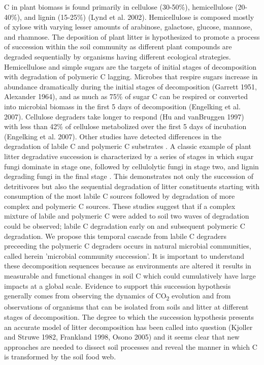 C in plant biomass is found primarily in cellulose (30-50\%), hemicellulose (20-40\%), and lignin (15-25\%) (Lynd et al. 2002). Hemicellulose is composed mostly of xylose with varying lesser amounts of arabinose, galactose, glucose, mannose, and rhamnose. The deposition of plant litter is hypothesized to promote a process of succession within the soil community as different plant compounds are degraded sequentially by organisms having different ecological strategies. Hemicellulose and simple sugars are the targets of initial stages of decomposition with degradation of polymeric C lagging. Microbes that respire sugars increase in abundance dramatically during the initial stages of decomposition (Garrett 1951, Alexander 1964), and as much as 75\% of sugar C can be respired or converted into microbial biomass in the first 5 days of decomposition (Engelking et al. 2007). Cellulose degraders take longer to respond (Hu and vanBruggen 1997) with less than 42\% of cellulose metabolized over the first 5 days of incubation (Engelking et al. 2007). Other studies have detected differences in the degradation of labile C and polymeric C substrates \cite{Engelking_2007,Anderson_1973,Stotzky_1961,Alden_2001,Furukawa_1996,Fontaine_2003,Blagodatskaya_2007,Jenkins_2010,Rui_2009,Fierer_2010}. A classic example of plant litter degradative succession is characterized by a series of stages in which sugar fungi dominate in stage one, followed by cellulolytic fungi in stage two, and lignin degrading fungi in the final stage \cite{Gessner_2010}. This demonstrates not only the succession of detritivores but also the sequential degradation of litter constituents starting with consumption of the most labile C sources followed by degradation of more complex and polymeric C sources. These studies suggest that if a complex mixture of labile and polymeric C were added to soil two waves of degradation could be observed; labile C degradation early on and subsequent polymeric C degradation. We propose this temporal cascade from labile C degraders preceeding the polymeric C degraders occurs in natural microbial communities, called herein 'microbial community succession'. It is important to understand these decomposition sequences because as environments are altered it results in measurable and functional changes in soil C \cite{Grandy_2008} which could cumulatively have large impacts at a global scale.  
Evidence to support this succession hypothesis generally comes from observing the dynamics of CO\textsubscript{2} evolution and from observations of organisms that can be isolated from soils and litter at different stages of decomposition. The degree to which the succession hypothesis presents an accurate model of litter decomposition has been called into question (Kjoller and Struwe 1982, Frankland 1998, Osono 2005) and it seems clear that new approaches are needed to dissect soil processes and reveal the manner in which C is transformed by the soil food web.




